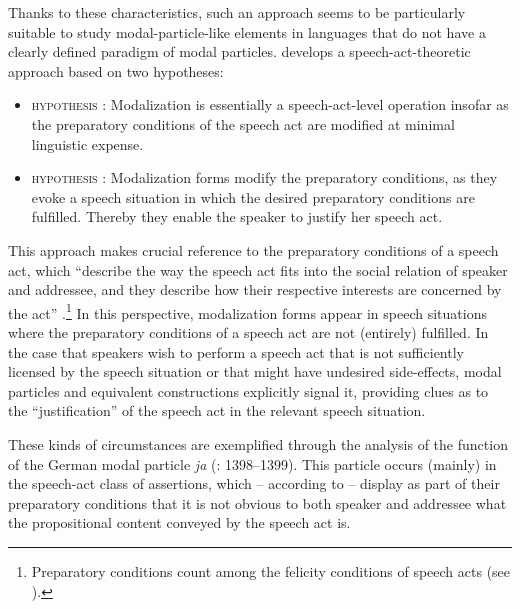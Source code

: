 Thanks to these characteristics, such an approach seems to be particularly suitable to study modal-particle-like elements in languages that do not have a clearly defined paradigm of modal particles. \citet[1393--1397]{Waltereit2001} develops a speech-act-theoretic approach based on two hypotheses:

\begin{itemize}
\item \textsc{hypothesis} : Modalization is essentially a speech-act-level operation insofar as the preparatory conditions of the speech act are modified at minimal linguistic expense.

\item \textsc{hypothesis} : Modalization forms modify the preparatory conditions, as they evoke a speech situation in which the desired preparatory conditions are fulfilled. Thereby they enable the speaker to justify her speech act.

\end{itemize}

\hspace*{-4.2pt}This approach makes crucial reference to the preparatory conditions of a speech act, which “describe the way the speech act fits into the social relation of speaker and addressee, and they describe how their respective interests are concerned by the act” \citep[1397]{Waltereit2001}.\footnote{Preparatory conditions count among the felicity conditions of speech acts (see \citealt[239]{Levinson1983}).} In this perspective, modalization forms appear in speech situations where the preparatory conditions of a speech act are not (entirely) fulfilled. In the case that speakers wish to perform a speech act that is not sufficiently licensed by the speech situation or that might have undesired side-effects, modal particles and equivalent constructions explicitly signal it, providing clues as to the “justification” of the speech act in the relevant speech situation.

These kinds of circumstances are exemplified through the analysis of the function of the German modal particle \textit{ja} (\citealt{Waltereit2001}: 1398–1399). This particle occurs (mainly) in the speech-act class of assertions, which – according to \citet{Searle1969} – display as part of their preparatory conditions that it is not obvious to both speaker and addressee what the propositional content conveyed by the speech act is.

\ea%
    \label{ex:key:7}

